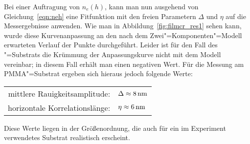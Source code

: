 Bei einer Auftragung von $n_e(h)$, kann man nun ausgehend von Gleichung~\eqref{eqn:neh} eine Fitfunktion mit den freien Parametern $\Delta$ und $\eta$ auf die Messergebnisse anwenden. Wie man in Abbildung~\ref{fig:filmcr_res1} sehen kann, wurde diese Kurvenanpassung an den nach dem Zwei"=Komponenten"=Modell erwarteten Verlauf der Punkte durchgeführt. Leider ist für den Fall des \SiO"=Substrats die Krümmung der Anpassungskurve nicht mit dem Modell vereinbar; in diesem Fall erhält man einen negativen Wert. Für die Messung am PMMA"=Substrat ergeben sich hieraus jedoch folgende Werte:

\begin{center}
	\begin{tabular}{rl}
	mittlere Rauigkeitsamplitude: &$\Delta\approx\unit[8]{nm}$\\
	horizontale Korrelationslänge: &$\eta\approx\unit[6]{nm}$\\
	\end{tabular}
\end{center}

Diese Werte liegen in der Größenordnung, die auch für ein im Experiment verwendetes Substrat realistisch erscheint.

